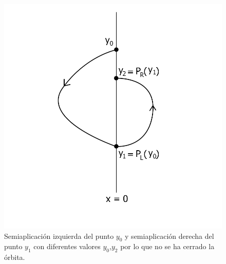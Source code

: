 \documentclass[12pt,a4paper]{report} %
\begin{document}
	 \begin{figure}[h]
		\centering
		\includegraphics[width=1\textwidth]{aplipoincareLR.jpg}
		\caption{Semiaplicación izquierda del punto $y_0$ y semiaplicación derecha del punto $y_1$ con diferentes valores $y_0$,$y_2$ por lo que no se ha cerrado la órbita.}
		\label{fig:aplipoincareLR}
	\end{figure}\smallskip
	
	\newpage
	
\end{document}
